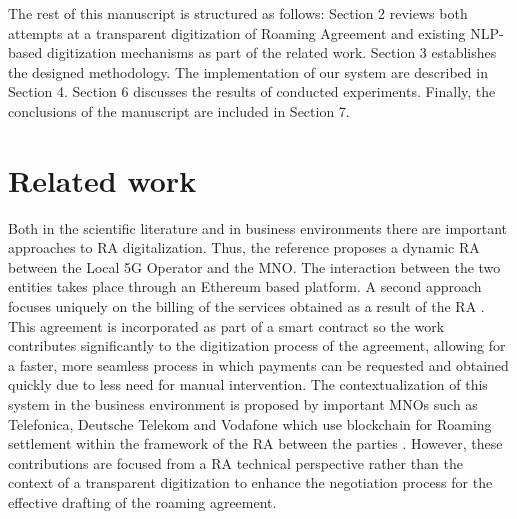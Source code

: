 \documentclass[conference]{style/IEEEtran}
\begin{document}
The rest of this manuscript is structured as follows: Section 2 reviews both attempts at a transparent digitization of Roaming Agreement and existing NLP-based digitization mechanisms as part of the related work. Section 3 establishes the designed methodology. The implementation of our system are described in Section 4. Section 6 discusses the results of conducted experiments. Finally, the conclusions of the manuscript are included in Section 7.

\section{Related work}

Both in the scientific literature and in business environments there are important approaches to RA digitalization. Thus, the reference \cite{b5} proposes a dynamic RA between the Local 5G Operator and the MNO. The interaction between the two entities takes place through an Ethereum based platform. A second approach focuses uniquely on the billing of the services obtained as a result of the RA \cite{b6}. This agreement is incorporated as part of a smart contract so the work contributes significantly to the digitization process of the agreement, allowing for a faster, more seamless process in which payments can be requested and obtained quickly due to less need for manual intervention. The contextualization of this system in the business environment is proposed by important MNOs such as Telefonica, Deutsche Telekom and Vodafone which use blockchain for Roaming settlement within the framework of the RA between the parties \cite{b7}. However, these contributions are focused from a RA technical perspective rather than the context of a transparent digitization to enhance the negotiation process for the effective drafting of the roaming agreement. 
\end{document}
